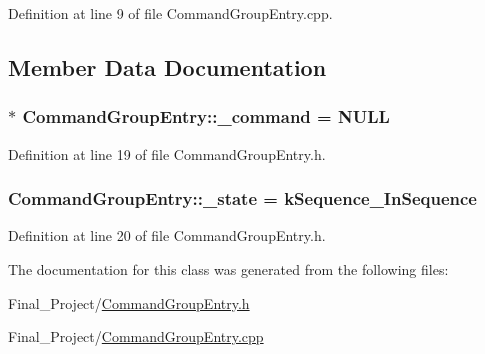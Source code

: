 Definition at line 9 of file Command\-Group\-Entry.\-cpp.



\subsection{Member Data Documentation}
\hypertarget{classCommandGroupEntry_a466202de6dd9aed12db553da04c726b2}{
\subsubsection[{\-\_\-command}]{$\ast$ Command\-Group\-Entry\-::\-\_\-command = N\-U\-L\-L}}\label{classCommandGroupEntry_a466202de6dd9aed12db553da04c726b2}


Definition at line 19 of file Command\-Group\-Entry.\-h.

\hypertarget{classCommandGroupEntry_a3a011ee2d2c871fce8a37dd3cb3d1ddf}{
\subsubsection[{\-\_\-state}]{ Command\-Group\-Entry\-::\-\_\-state = {\bf k\-Sequence\-\_\-\-In\-Sequence}}}\label{classCommandGroupEntry_a3a011ee2d2c871fce8a37dd3cb3d1ddf}


Definition at line 20 of file Command\-Group\-Entry.\-h.



The documentation for this class was generated from the following files\-:\begin{DoxyCompactItemize}
\item 
Final\-\_\-\-Project/\hyperlink{CommandGroupEntry_8h}{Command\-Group\-Entry.\-h}\item 
Final\-\_\-\-Project/\hyperlink{CommandGroupEntry_8cpp}{Command\-Group\-Entry.\-cpp}\end{DoxyCompactItemize}
